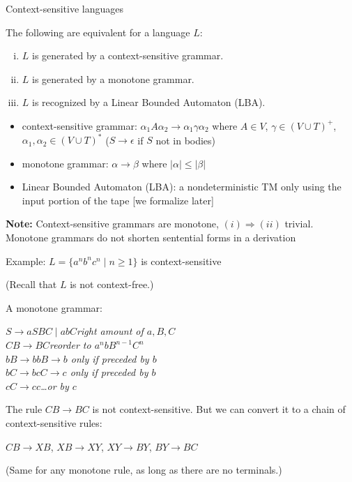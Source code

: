 \documentclass[handout]{beamer}
\begin{document}
\begin{frame}{Context-sensitive languages}

    \begin{theorem}
        The following are equivalent for a language $L$:
        \begin{enumerate}[(i)]
            \item $L$ is generated by a \alert{context-sensitive} grammar.
            \item $L$ is generated by a \alert{monotone} grammar.
            \item $L$ is recognized by a \alert{Linear Bounded Automaton} (\alert{LBA}).
        \end{enumerate}
    \end{theorem}

    \begin{itemize}
        \item \alert{context-sensitive} grammar: $\alpha_1 A \alpha_2\rightarrow \alpha_1\gamma\alpha_2$ where $A\in V$, $\gamma\in(V\cup T)^+$, $\alpha_1,\alpha_2\in (V\cup T)^*$ ($S\to\epsilon$ if $S$ not in bodies)
        \item \alert{monotone} grammar: $\alpha\to\beta$ where $|\alpha|\leq|\beta|$
        \item \alert{Linear Bounded Automaton} (\alert{LBA}): a nondeterministic TM only using the input portion of the tape [we formalize later]
    \end{itemize}

    \textbf{Note:} Context-sensitive grammars are monotone, $(i)\Rightarrow(ii)$ trivial.\\
    Monotone grammars do not shorten sentential forms in a derivation

\end{frame}


\begin{frame}{Example: $L=\{a^nb^nc^n\mid n\geq 1\} $ is context-sensitive}

    (Recall that $L$ is not context-free.)

    \medskip

    A \alert{monotone} grammar:

    \qquad$S\rightarrow aSBC\mid abC$\hfill{\it right amount of $a,B,C$}\\
    \qquad\alert{$CB\rightarrow BC$}\hfill{\it reorder to $a^nbB^{n-1}C^n$}\\
    \qquad$bB\rightarrow bb$\hfill{\it $B\to b$ only if preceded by $b$}\\
    \qquad$bC\rightarrow bc$\hfill{\it $C\to c$ only if preceded by $b$}\\
    \qquad$cC\rightarrow cc$\hfill{\it\dots or by $c$}

    \bigskip

    The rule $CB\rightarrow BC$ is not context-sensitive. But we can convert it to a chain of context-sensitive rules:

    \qquad$CB\rightarrow XB$, $XB\rightarrow XY$, $XY\rightarrow BY$, $BY\rightarrow BC$

    (Same for any monotone rule, as long as there are no terminals.)
    
\end{frame}
\end{document}
